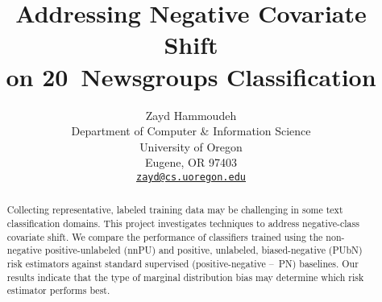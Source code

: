 \documentclass{article}
\title{Addressing Negative Covariate Shift \\ on 20~Newsgroups Classification}
\author{%
  Zayd Hammoudeh \\
  Department of Computer \& Information Science \\
  University of Oregon \\
  Eugene, OR 97403 \\
  \texttt{\href{mailto:zayd@cs.uoregon.edu}{zayd@cs.uoregon.edu}}
}
\begin{document}
\maketitle

\begin{abstract}
  Collecting representative, labeled training data may be challenging in some text classification domains. This project investigates techniques to address negative-class covariate shift.  We compare the performance of classifiers trained using the non-negative positive-unlabeled (nnPU) and positive, unlabeled, biased-negative (PUbN) risk estimators against standard supervised (positive-negative --~PN) baselines. Our results indicate that the type of marginal distribution bias may determine which risk estimator performs best.
\end{abstract}










\end{document}
